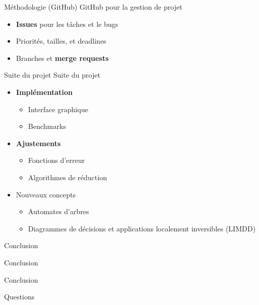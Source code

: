 \documentclass[french, 12pt]{beamer}
\begin{document}
\begin{frame}{Méthodologie (GitHub)}
    GitHub pour la gestion de projet
    \begin{itemize}
        \item \textbf{Issues} pour les tâches et le bugs
        \item Priorités, tailles, et deadlines
        \item Branches et \textbf{merge requests}
    \end{itemize}
\end{frame}



\begin{frame}{Suite du projet}
Suite du projet
\begin{itemize}
    \item \textbf{Implémentation}
    \begin{itemize}
        \item Interface graphique
        \item Benchmarks
    \end{itemize}
    \item \textbf{Ajustements}
    \begin{itemize}
        \item Fonctions d'erreur
        \item Algorithmes de réduction
    \end{itemize}
    \item Nouveaux concepts
    \begin{itemize}
        \item Automates d'arbres
        \item Diagrammes de décisions et applications localement inversibles (LIMDD)
    \end{itemize}
\end{itemize}
\end{frame}



\begin{frame}{Conclusion}
\begin{center}
    \huge{Conclusion}
\end{center}
\end{frame}

\begin{frame}{Conclusion}
    \begin{center}
        \huge{Questions}
    \end{center}
\end{frame}


\end{document}
